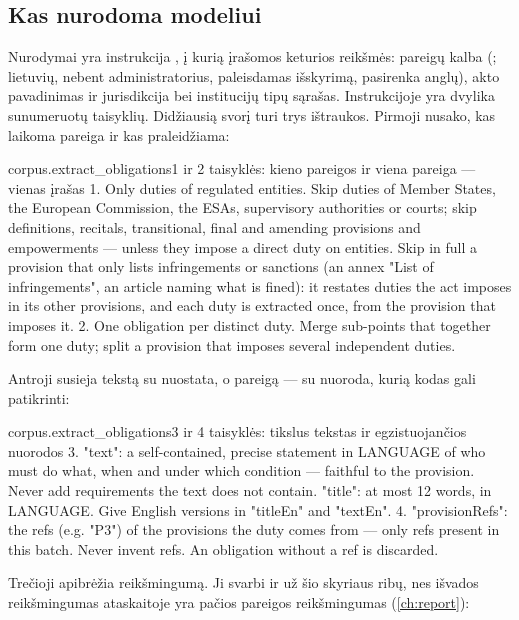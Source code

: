 \subsection{Kas nurodoma modeliui}

Nurodymai yra instrukcija , į kurią įrašomos keturios
reikšmės: pareigų kalba (; lietuvių, nebent administratorius, paleisdamas
išskyrimą, pasirenka anglų), akto pavadinimas ir jurisdikcija bei institucijų tipų sąrašas.
Instrukcijoje yra dvylika sunumeruotų taisyklių. Didžiausią svorį turi trys ištraukos. Pirmoji
nusako, kas laikoma pareiga ir kas praleidžiama:

\begin{promptexcerpt}{corpus.extract_obligations}{1 ir 2 taisyklės: kieno pareigos ir viena pareiga --- vienas įrašas}
1. Only duties of regulated entities. Skip duties of Member States, the European
   Commission, the ESAs, supervisory authorities or courts; skip definitions,
   recitals, transitional, final and amending provisions and empowerments — unless
   they impose a direct duty on entities. Skip in full a provision that only lists
   infringements or sanctions (an annex "List of infringements", an article naming
   what is fined): it restates duties the act imposes in its other provisions, and
   each duty is extracted once, from the provision that imposes it.
2. One obligation per distinct duty. Merge sub-points that together form one duty;
   split a provision that imposes several independent duties.
\end{promptexcerpt}

Antroji susieja tekstą su nuostata, o pareigą --- su nuoroda, kurią kodas gali patikrinti:

\begin{promptexcerpt}{corpus.extract_obligations}{3 ir 4 taisyklės: tikslus tekstas ir egzistuojančios nuorodos}
3. "text": a self-contained, precise statement in {LANGUAGE} of who must do what,
   when and under which condition — faithful to the provision. Never add
   requirements the text does not contain. "title": at most 12 words, in
   {LANGUAGE}. Give English versions in "titleEn" and "textEn".
4. "provisionRefs": the refs (e.g. "P3") of the provisions the duty comes from —
   only refs present in this batch. Never invent refs. An obligation without a ref
   is discarded.
\end{promptexcerpt}

Trečioji apibrėžia reikšmingumą. Ji svarbi ir už šio skyriaus ribų, nes išvados reikšmingumas
ataskaitoje yra pačios pareigos reikšmingumas (\cref{ch:report}):

